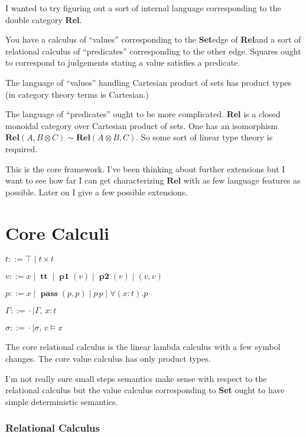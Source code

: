 \documentclass[twocolumn]{scrartcl}
\newcommand{\Rel}{\textbf{Rel}}
\newcommand{\Set}{\textbf{Set}}
\newcommand{\bnfdef}{\mathbin{::=}}
\DeclareMathOperator{\coin}{\textbf{tt}}
\DeclareMathOperator{\fst}{\textbf{p1}}
\DeclareMathOperator{\snd}{\textbf{p2}}
\DeclareMathOperator{\pass}{\textbf{pass}}
\begin{document}
I wanted to try figuring out a sort of internal language corresponding
to the double category \Rel.

You have a calculus of ``values'' corresponding to the \Set edge of
\Rel and a sort of relational calculus of ``predicates'' corresponding
to the other edge. Squares ought to correspond to judgements stating a
value satisfies a predicate.

The language of ``values'' handling Cartesian product of sets has
product types (in category theory terms is Cartesian.)

The language of ``predicates'' ought to be more complicated. \Rel
is a closed monoidal category over Cartesian product of sets.  One has
an isomorphism \( \Rel(A, B \otimes C) \sim \Rel (A \otimes B, C) \).
So some sort of linear type theory is required.

This is the core framework.  I've been thinking about further
extensions but I want to see how far I can get characterizing
\(\Rel\) with as few language features as possible.  Later on I
give a few possible extensions.

\section*{Core Calculi}

\begin{description}[nosep]
\item[Types] \hfill \( t \bnfdef \top \mid t \times t \)
\item[Values] \hfill \( v \bnfdef x \mid \coin \mid \fst(v) \mid \snd(v) \mid ( v , v ) \)
\item[Predicates] \hfill \( p \bnfdef x \mid \pass(p, p) \mid p \, p \mid \forall (x \colon t) . p \)
\item[Environment] \hfill \( \Gamma \bnfdef \cdot \mid \Gamma , \, x \colon t  \)
\item[Substitutions] \hfill \( \sigma \bnfdef \cdot \mid \sigma , \, v \models x  \)
\end{description}

The core relational calculus is the linear lambda calculus with a few
symbol changes.  The core value calculus has only product types.

I'm not really sure small steps semantics make sense with respect to
the relational calculus but the value calculus corresponding to \Set
ought to have simple deterministic semantics.

\subsubsection*{Relational Calculus}
\end{document}
